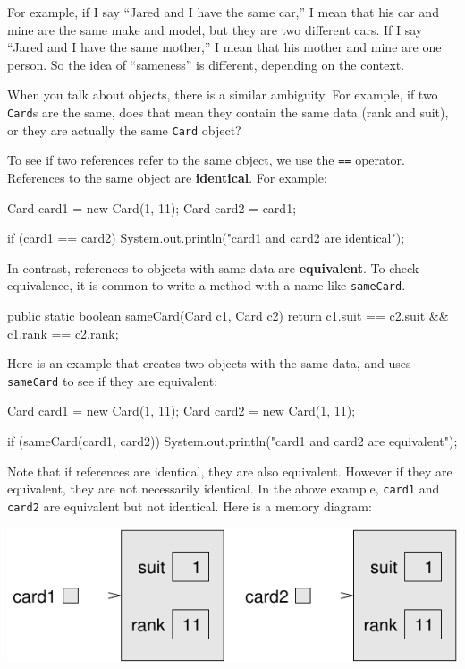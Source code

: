 \documentclass[12pt]{book}
\theoremstyle{exercise}
\newcommand{\java}[1]{\verb"#1"}
\newcommand{\java}[1]{\lstinline{#1}} %
\begin{document}
For example, if I say ``Jared and I have the same car,'' I mean that his car and mine are the same make and model, but they are two different cars.
If I say ``Jared and I have the same mother,'' I mean that his mother and mine are one person.
So the idea of ``sameness'' is different, depending on the context.


When you talk about objects, there is a similar ambiguity.
For example, if two \java{Card}s are the same, does that mean they contain the same data (rank and suit), or they are actually the same \java{Card} object?


To see if two references refer to the same object, we use the \java{==} operator.
References to the same object are {\bf identical}.
For example:

\begin{code}
    Card card1 = new Card(1, 11);
    Card card2 = card1;

    if (card1 == card2) {
        System.out.println("card1 and card2 are identical");
    }
\end{code}


In contrast, references to objects with same data are {\bf equivalent}.
To check equivalence, it is common to write a method with a name like \java{sameCard}.

\begin{code}
    public static boolean sameCard(Card c1, Card c2) {
        return c1.suit == c2.suit && c1.rank == c2.rank;
    }
\end{code}

Here is an example that creates two objects with the same data, and uses \java{sameCard} to see if they are equivalent:

\begin{code}
    Card card1 = new Card(1, 11);
    Card card2 = new Card(1, 11);

    if (sameCard(card1, card2)) {
        System.out.println("card1 and card2 are equivalent");
    }
\end{code}

Note that if references are identical, they are also equivalent.
However if they are equivalent, they are not necessarily identical.
In the above example, \java{card1} and \java{card2} are equivalent but not identical.
Here is a memory diagram:

\begin{center}
\includegraphics{figs/card.pdf}
\end{center}
\end{document}
